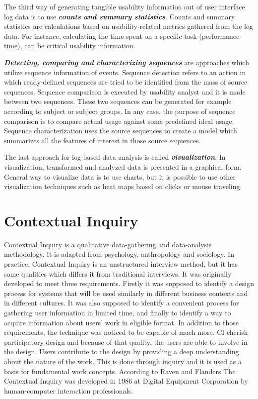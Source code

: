 \documentclass[12pt,a4paper,oneside,pdftex]{report}
\begin{document}
The third way of generating tangible usability information out of user interface log data is to use \textbf{\emph{counts and summary statistics}}. Counts and summary statistics are calculations based on usability-related metrics gathered from the log data. For instance, calculating the time spent on a specific task (performance time), can be critical usability information. \cite{RefWorks:24, RefWorks:25}

\textbf{\emph{Detecting, comparing and characterizing sequences}} are approaches which utilize sequence information of events. Sequence detection refers to an action in which ready-defined sequences are tried to be identified from the mass of source sequences. Sequence comparison is  executed by usability analyst and it is made between two sequences. These two sequences can be generated for example according to subject or subject groups. In any case, the purpose of sequence comparison is to compare actual usage against some predefined ideal usage. Sequence characterization uses the source sequences to create a model which summarizes all the features of interest in those source sequences. \cite{RefWorks:24, RefWorks:25}
 
The last approach for log-based data analysis is called \textbf{\emph{visualization}}. In visualization, transformed and analyzed data is  presented in a graphical form. General way to visualize data is to use charts, but it is possible to use other visualization techniques such as heat maps based on clicks or mouse traveling. \cite{RefWorks:24, RefWorks:25}

\section{Contextual Inquiry}
\label{sec:cinquiry}
Contextual Inquiry is a qualitative data-gathering and data-analysis methodology. It is adapted from psychology, anthropology and sociology. \cite{RefWorks:28} In practice, Contextual Inquiry is an unstructured interview method, but it has some qualities which differs it from traditional interviews.\cite{RefWorks:23}  It was originally developed to meet three requirements. Firstly it was supposed to identify a design process for systems that will be used similarly in different business contexts and in different cultures. It was also supposed to identify a convenient process for gathering user information in limited time, and finally to identify a way to acquire information about users' work in eligible format. In addition to those requirements, the technique was noticed to be capable of much more. CI cherish participatory design and because of that quality, the users are able to involve in the design. Users contribute to the design by providing a deep understanding about the nature of the work. This is done through inquiry and it is used as a basis for fundamental work concepts. \cite{RefWorks:14} According to Raven and Flanders \cite{RefWorks:28}  The Contextual Inquiry was developed in 1986 at Digital Equipment Corporation by human-computer interaction professionals. \cite{RefWorks:28} 
\end{document}
